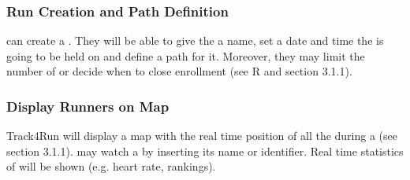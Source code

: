 \documentclass[../../rasd.tex]{subfiles}
\begin{document}
		\subsubsection{Run Creation and Path Definition}
		 can create a . They will be able to give the  a name, set a date and time the  is going to be held on and define a path for it. Moreover, they may limit the number of  or decide when to close enrollment (see R and section 3.1.1).
		
		\subsubsection{Display Runners on Map}
		Track4Run will display a map with the real time position of all the  during a  (see section 3.1.1).  may watch a  by inserting its name or identifier. Real time statistics of  will be shown (e.g. heart rate, rankings). 
\end{document}
